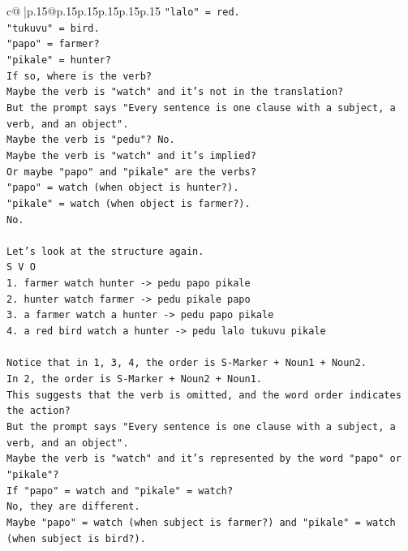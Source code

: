 \documentclass{article}
\begin{document}
{\begin{supertabular}{c@{$\;$}|p{.15\linewidth}@{}p{.15\linewidth}p{.15\linewidth}p{.15\linewidth}p{.15\linewidth}p{.15\linewidth}}
{{{\texttt{"lalo" = red.} \\
\texttt{"tukuvu" = bird.} \\
\texttt{"papo" = farmer?} \\
\texttt{"pikale" = hunter?} \\
\texttt{If so, where is the verb?} \\
\texttt{Maybe the verb is "watch" and it's not in the translation?} \\
\texttt{But the prompt says "Every sentence is one clause with a subject, a verb, and an object".} \\
\texttt{Maybe the verb is "pedu"? No.} \\
\texttt{Maybe the verb is "watch" and it's implied?} \\
\texttt{Or maybe "papo" and "pikale" are the verbs?} \\
\texttt{"papo" = watch (when object is hunter?).} \\
\texttt{"pikale" = watch (when object is farmer?).} \\
\texttt{No.} \\
\\ 
\texttt{Let's look at the structure again.} \\
\texttt{S V O} \\
\texttt{1. farmer watch hunter {-}> pedu papo pikale} \\
\texttt{2. hunter watch farmer {-}> pedu pikale papo} \\
\texttt{3. a farmer watch a hunter {-}> pedu papo pikale} \\
\texttt{4. a red bird watch a hunter {-}> pedu lalo tukuvu pikale} \\
\\ 
\texttt{Notice that in 1, 3, 4, the order is S{-}Marker + Noun1 + Noun2.} \\
\texttt{In 2, the order is S{-}Marker + Noun2 + Noun1.} \\
\texttt{This suggests that the verb is omitted, and the word order indicates the action?} \\
\texttt{But the prompt says "Every sentence is one clause with a subject, a verb, and an object".} \\
\texttt{Maybe the verb is "watch" and it's represented by the word "papo" or "pikale"?} \\
\texttt{If "papo" = watch and "pikale" = watch?} \\
\texttt{No, they are different.} \\
\texttt{Maybe "papo" = watch (when subject is farmer?) and "pikale" = watch (when subject is bird?).} \\
}}}
\end{supertabular}}
\end{document}
